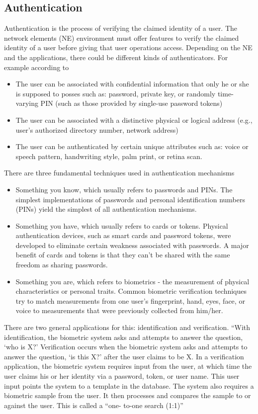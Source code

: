 \documentclass[12pt]{article}			%
\begin{document}
\subsection{ Authentication }
Authentication is the process of verifying the claimed identity of a user. The network elements
(NE) environment must offer features to verify the claimed identity of a user before giving that
user operations access. Depending on the NE and the applications, there could be different kinds
of authenticators. For example according to \cite{war02}
\begin{itemize}
\item The user can be associated with confidential information that only he or she is supposed
to posses such as: password, private key, or randomly time-varying PIN (such as those
provided by single-use password tokens)
\item The user can be associated with a distinctive physical or logical address (e.g., user’s
authorized directory number, network address)
\item The user can be authenticated by certain unique attributes such as: voice or speech
pattern, handwriting style, palm print, or retina scan.
\end{itemize}
There are three fundamental techniques used in authentication mechanisms\cite{john03}
\begin{itemize}
\item Something you know, which usually refers to passwords and PINs. The simplest
implementations of passwords and personal identification numbers (PINs) yield the
simplest of all authentication mechanisms.
\item Something you have, which usually refers to cards or tokens. Physical authentication
devices, such as smart cards and password tokens, were developed to eliminate certain
weakness associated with passwords. A major benefit of cards and tokens is that they
can’t be shared with the same freedom as sharing passwords.
\item Something you are, which refers to biometrics - the measurement of physical
characteristics or personal traits. Common biometric verification techniques try to match
measurements from one user’s fingerprint, hand, eyes, face, or voice to measurements that
were previously collected from him/her.
\end{itemize}
There are two general applications for this: identification and verification. “With identification,
the biometric system asks and attempts to answer the question, ‘who is X?’ Verification occurs
when the biometric system asks and attempts to answer the question, ‘is this X?’ after the user
claims to be X. In a verification application, the biometric system requires input from the user, at
which time the user claims his or her identity via a password, token, or user name. This user input
points the system to a template in the database. The system also requires a biometric sample from
the user. It then processes and compares the sample to or against the user. This is called a “one-
to-one search (1:1)”
\end{document}
